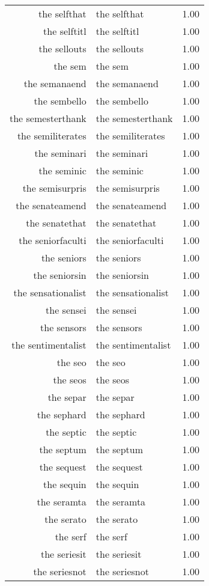 \begin{table}[ht]
\begin{tabular}{rlr}
  the selfthat & the selfthat & 1.00 \\ 
  the selftitl & the selftitl & 1.00 \\ 
  the sellouts & the sellouts & 1.00 \\ 
  the sem & the sem & 1.00 \\ 
  the semanaend & the semanaend & 1.00 \\ 
  the sembello & the sembello & 1.00 \\ 
  the semesterthank & the semesterthank & 1.00 \\ 
  the semiliterates & the semiliterates & 1.00 \\ 
  the seminari & the seminari & 1.00 \\ 
  the seminic & the seminic & 1.00 \\ 
  the semisurpris & the semisurpris & 1.00 \\ 
  the senateamend & the senateamend & 1.00 \\ 
  the senatethat & the senatethat & 1.00 \\ 
  the seniorfaculti & the seniorfaculti & 1.00 \\ 
  the seniors & the seniors & 1.00 \\ 
  the seniorsin & the seniorsin & 1.00 \\ 
  the sensationalist & the sensationalist & 1.00 \\ 
  the sensei & the sensei & 1.00 \\ 
  the sensors & the sensors & 1.00 \\ 
  the sentimentalist & the sentimentalist & 1.00 \\ 
  the seo & the seo & 1.00 \\ 
  the seos & the seos & 1.00 \\ 
  the separ & the separ & 1.00 \\ 
  the sephard & the sephard & 1.00 \\ 
  the septic & the septic & 1.00 \\ 
  the septum & the septum & 1.00 \\ 
  the sequest & the sequest & 1.00 \\ 
  the sequin & the sequin & 1.00 \\ 
  the seramta & the seramta & 1.00 \\ 
  the serato & the serato & 1.00 \\ 
  the serf & the serf & 1.00 \\ 
  the seriesit & the seriesit & 1.00 \\ 
  the seriesnot & the seriesnot & 1.00 \\ 

\end{tabular}
\end{table}
